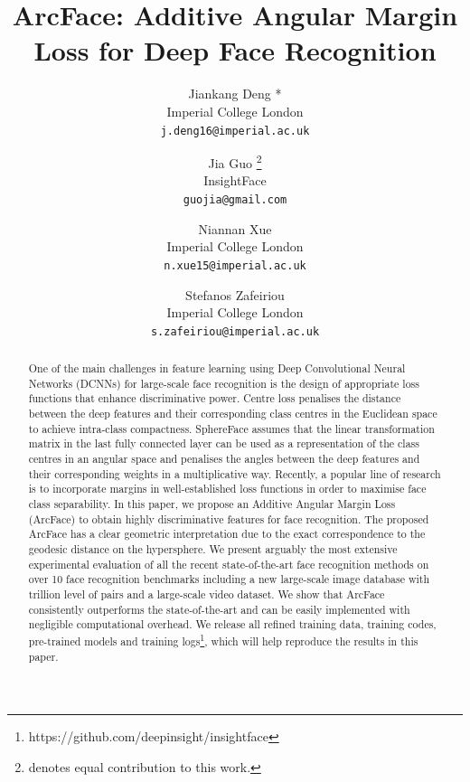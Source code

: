 \documentclass[10pt,twocolumn,letterpaper]{article}
\begin{document}
\title{ArcFace: Additive Angular Margin Loss for Deep Face Recognition}

\author{Jiankang Deng *\\
Imperial College London\\
{\tt\small j.deng16@imperial.ac.uk}
\and
Jia Guo \thanks{denotes equal contribution to this work.}\\
InsightFace\\
{\tt\small guojia@gmail.com}
\and
Niannan Xue\\
Imperial College London\\
{\tt\small n.xue15@imperial.ac.uk}
\and
Stefanos Zafeiriou\\
Imperial College London\\
{\tt\small s.zafeiriou@imperial.ac.uk}
}

\maketitle

\begin{abstract}
One of the main challenges in feature learning using Deep Convolutional Neural Networks (DCNNs) for large-scale face recognition is the design of appropriate loss functions that enhance discriminative power. Centre loss penalises the distance between the deep features and their corresponding class centres in the Euclidean space to achieve intra-class compactness. SphereFace assumes that the linear transformation matrix in the last fully connected layer can be used as a representation of the class centres in an angular space and penalises the angles between the deep features and their corresponding weights in a multiplicative way. Recently, a popular line of research is to incorporate margins in well-established loss functions in order to maximise face class separability. In this paper, we propose an Additive Angular Margin Loss (ArcFace) to obtain highly discriminative features for face recognition. The proposed ArcFace has a clear geometric interpretation due to the exact correspondence to the geodesic distance on the hypersphere. We present arguably the most extensive experimental evaluation of all the recent state-of-the-art face recognition methods on over 10 face recognition benchmarks including a new large-scale image database with trillion level of pairs and a large-scale video dataset. We show that ArcFace consistently outperforms the state-of-the-art and can be easily implemented with negligible computational overhead. We release all refined training data, training codes, pre-trained models and training logs\footnote{https://github.com/deepinsight/insightface}, which will help reproduce the results in this paper.
\end{abstract}
\end{document}
